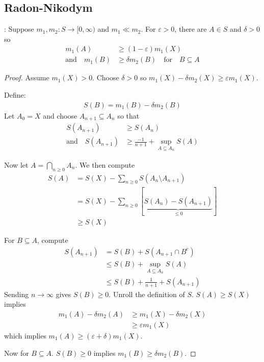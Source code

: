\subsection{Radon-Nikodym}

\begin{lemma}: Suppose $m_1, m_2 : S \to [0, \infty)$ and $m_1 \ll m_2$.
For $\varepsilon > 0$, there are $A \in S$ and $\delta > 0$ so
\begin{align*}
			m_1 (A) &\geq (1 - \varepsilon) m_1 (X) \\
	\text{and} \quad m_1 (B) &\geq \delta m_2 (B) \quad \text{for} \quad B \subseteq A
\end{align*}
\end{lemma}


\begin{proof}
	Assume $m_1 (X) > 0$. Choose $\delta > 0$ so $m_1 (X) - \delta m_2 (X) \geq \varepsilon m_1 (X)$.

	\noindent Define:
	\begin{align*}
		S (B) = m_1 (B) - \delta m_2 (B)
	\end{align*}
	Let $A_0 = X$ and choose  $A_{n+1} \subseteq A_{n}$ so that
	\begin{align*}
		S( A_{n + 1} ) &\geq S (A_{n}) \\
		\text{and} \quad S(A_{n+1} ) &\geq \frac{-1}{n+1} + \sup_{A \subseteq A_{n}} S (A)
	\end{align*}

	\noindent Now let $A = \bigcap_{n \geq 0} A_n$. We then compute
	\begin{align*}
		S(A) &= S(X) - \sum_{n \geq 0} S( A_n \setminus A_{n+1} ) \\
         &= S(X) - \sum_{n \geq 0} [\underbrace{S(A_{n}) - S(A_{n+1})}_{\leq 0}  ] \\
			 &\geq S(X)
	\end{align*}

	\noindent For $B \subseteq A$, compute
	\begin{align*}
		S(A_{n + 1}) &= S(B) + S(A_{n+1} \cap B^c ) \\
					&\leq S(B) + \sup_{A \subseteq A_{n}} S(A) \\
					&\leq S(B) + \frac{1}{n+1} + S(A_{n+1} )
	\end{align*}
	Sending $n \to \infty$ gives $S(B) \geq 0$. Unroll the definition of $S$. $S(A) \geq S(X)$ implies
	\begin{align*}
		m_1 (A) - \delta m_2 (A) &\geq m_1 (X) - \delta m_2 (X) \\
								 &\geq \varepsilon m_1 (X)
	\end{align*} which implies $m_1 (A) \geq ( \varepsilon + \delta) m_1 (X)$.

	Now for $B \subseteq A$. $S(B) \geq 0$ implies $m_1 (B) \geq \delta m_2 (B)$.
\end{proof}

